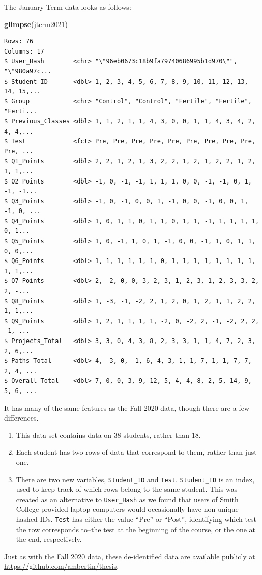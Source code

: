 \documentclass[12pt,twoside]{reedthesis}
\newenvironment{Shaded}{\begin{snugshade}}{\end{snugshade}}
\newcommand{\KeywordTok}[1]{\textcolor[rgb]{0.13,0.29,0.53}{\textbf{#1}}}
\newcommand{\NormalTok}[1]{#1}
\providecommand{\tightlist}{%
  \setlength{\itemsep}{0pt}\setlength{\parskip}{0pt}}
\begin{document}
The January Term data looks as follows:
\begin{Shaded}
\begin{Highlighting}[]
\KeywordTok{glimpse}\NormalTok{(jterm2021)}
\end{Highlighting}
\end{Shaded}
\small
\begin{verbatim}
Rows: 76
Columns: 17
$ User_Hash        <chr> "\"96eb0673c18b9fa79740686995b1d970\"", "\"980a97c...
$ Student_ID       <dbl> 1, 2, 3, 4, 5, 6, 7, 8, 9, 10, 11, 12, 13, 14, 15,...
$ Group            <chr> "Control", "Control", "Fertile", "Fertile", "Ferti...
$ Previous_Classes <dbl> 1, 1, 2, 1, 1, 4, 3, 0, 0, 1, 1, 4, 3, 4, 2, 4, 4,...
$ Test             <fct> Pre, Pre, Pre, Pre, Pre, Pre, Pre, Pre, Pre, Pre, ...
$ Q1_Points        <dbl> 2, 2, 1, 2, 1, 3, 2, 2, 1, 2, 1, 2, 2, 1, 2, 1, 1,...
$ Q2_Points        <dbl> -1, 0, -1, -1, 1, 1, 1, 0, 0, -1, -1, 0, 1, -1, -1...
$ Q3_Points        <dbl> -1, 0, -1, 0, 0, 1, -1, 0, 0, -1, 0, 0, 1, -1, 0, ...
$ Q4_Points        <dbl> 1, 0, 1, 1, 0, 1, 1, 0, 1, 1, -1, 1, 1, 1, 1, 0, 1...
$ Q5_Points        <dbl> 1, 0, -1, 1, 0, 1, -1, 0, 0, -1, 1, 0, 1, 1, 0, 0,...
$ Q6_Points        <dbl> 1, 1, 1, 1, 1, 1, 0, 1, 1, 1, 1, 1, 1, 1, 1, 1, 1,...
$ Q7_Points        <dbl> 2, -2, 0, 0, 3, 2, 3, 1, 2, 3, 1, 2, 3, 3, 2, 2, -...
$ Q8_Points        <dbl> 1, -3, -1, -2, 2, 1, 2, 0, 1, 2, 1, 1, 2, 2, 1, 1,...
$ Q9_Points        <dbl> 1, 2, 1, 1, 1, 1, -2, 0, -2, 2, -1, -2, 2, 2, -1, ...
$ Projects_Total   <dbl> 3, 3, 0, 4, 3, 8, 2, 3, 3, 1, 1, 4, 7, 2, 3, 2, 6,...
$ Paths_Total      <dbl> 4, -3, 0, -1, 6, 4, 3, 1, 1, 7, 1, 1, 7, 7, 2, 4, ...
$ Overall_Total    <dbl> 7, 0, 0, 3, 9, 12, 5, 4, 4, 8, 2, 5, 14, 9, 5, 6, ...
\end{verbatim}
\normalsize

It has many of the same features as the Fall 2020 data, though there are a few differences.
\begin{enumerate}
\def\labelenumi{\arabic{enumi}.}
\tightlist
\item
  This data set contains data on 38 students, rather than 18.
\item
  Each student has two rows of data that correspond to them, rather than just one.
\item
  There are two new variables, \texttt{Student\_ID} and \texttt{Test}. \texttt{Student\_ID} is an index, used to keep track of which rows belong to the same student. This was created as an alternative to \texttt{User\_Hash} as we found that users of Smith College-provided laptop computers would occasionally have non-unique hashed IDs. \texttt{Test} has either the value ``Pre'' or ``Post'', identifying which test the row corresponds to--the test at the beginning of the course, or the one at the end, respectively.
\end{enumerate}
Just as with the Fall 2020 data, these de-identified data are available publicly at \url{https://github.com/ambertin/thesis}.
\end{document}
